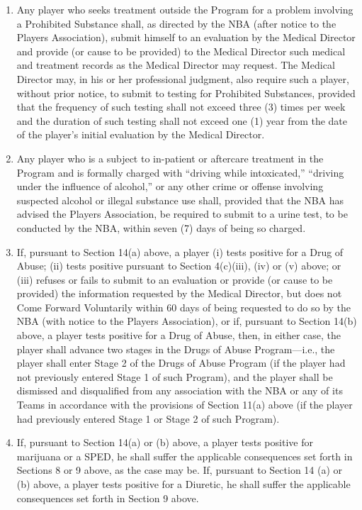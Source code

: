 \documentclass[
]{book}
\providecommand{\tightlist}{%
  \setlength{\itemsep}{0pt}\setlength{\parskip}{0pt}}
\begin{document}
\begin{enumerate}
\def\labelenumi{(\alph{enumi})}
\tightlist
\item
  Any player who seeks treatment outside the Program for a problem involving a Prohibited Substance shall, as directed by the NBA (after notice to the Players Association), submit himself to an evaluation by the Medical Director and provide (or cause to be provided) to the Medical Director such medical and treatment records as the Medical Director may request. The Medical Director may, in his or her professional judgment, also require such a player, without prior notice, to submit to testing for Prohibited Substances, provided that the frequency of such testing shall not exceed three (3) times per week and the duration of such testing shall not exceed one (1) year from the date of the player's initial evaluation by the Medical Director.
\item
  Any player who is a subject to in-patient or aftercare treatment in the Program and is formally charged with ``driving while intoxicated,'' ``driving under the influence of alcohol,'' or any other crime or offense involving suspected alcohol or illegal substance use shall, provided that the NBA has advised the Players Association, be required to submit to a urine test, to be conducted by the NBA, within seven (7) days of being so charged.
\item
  If, pursuant to Section 14(a) above, a player (i) tests positive for a Drug of Abuse; (ii) tests positive pursuant to Section 4(c)(iii), (iv) or (v) above; or (iii) refuses or fails to submit to an evaluation or provide (or cause to be provided) the information requested by the Medical Director, but does not Come Forward Voluntarily within 60 days of being requested to do so by the NBA (with notice to the Players Association), or if, pursuant to Section 14(b) above, a player tests positive for a Drug of Abuse, then, in either case, the player shall advance two stages in the Drugs of Abuse Program---i.e., the player shall enter Stage 2 of the Drugs of Abuse Program (if the player had not previously entered Stage 1 of such Program), and the player shall be dismissed and disqualified from any association with the NBA or any of its Teams in accordance with the provisions of Section 11(a) above (if the player had previously entered Stage 1 or Stage 2 of such Program).
\item
  If, pursuant to Section 14(a) or (b) above, a player tests positive for marijuana or a SPED, he shall suffer the applicable consequences set forth in Sections 8 or 9 above, as the case may be. If, pursuant to Section 14 (a) or (b) above, a player tests positive for a Diuretic, he shall suffer the applicable consequences set forth in Section 9 above.

\end{enumerate}
\end{document}
